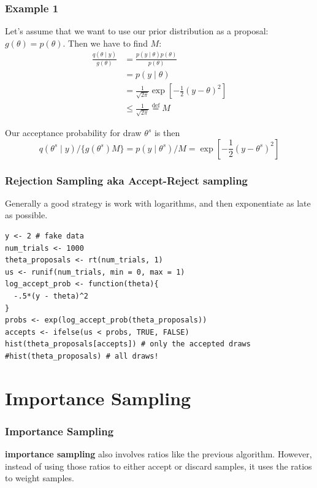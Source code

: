 \documentclass{beamer}
\begin{document}
\begin{frame}[fragile]
\frametitle{Example 1}

Let's assume that we want to use our prior distribution as a proposal: $g(\theta) = p(\theta)$. Then we have to find $M$:
\begin{align*}
\frac{q(\theta\mid y)}{g(\theta)} &= \frac{p(y \mid \theta) p(\theta)}{p(\theta)} \\
&= p(y \mid \theta) \\
&= \frac{1}{\sqrt{2\pi}} \exp\left[-\frac{1}{2} (y-\theta)^2 \right] \\
&\le \frac{1}{\sqrt{2\pi}} \overset{\text{def}}{=} M
\end{align*}

Our acceptance probability for draw $\theta^s$ is then
\[
q(\theta^s \mid y) / \{ g(\theta^s)  M\} = p(y \mid \theta^s) / M = \exp\left[-\frac{1}{2} (y-\theta^s)^2 \right]
\]


\end{frame}
\begin{frame}[fragile]
\frametitle{Rejection Sampling aka Accept-Reject sampling}

Generally a good strategy is work with logarithms, and then exponentiate as late as possible.
\begin{verbatim}
y <- 2 # fake data
num_trials <- 1000
theta_proposals <- rt(num_trials, 1)
us <- runif(num_trials, min = 0, max = 1)
log_accept_prob <- function(theta){
  -.5*(y - theta)^2
}
probs <- exp(log_accept_prob(theta_proposals))
accepts <- ifelse(us < probs, TRUE, FALSE)
hist(theta_proposals[accepts]) # only the accepted draws
#hist(theta_proposals) # all draws!
\end{verbatim}

\end{frame}

\section{Importance Sampling}
\begin{frame}[fragile]
\frametitle{Importance Sampling}

{\bf importance sampling} also involves ratios like the previous algorithm. However, instead of using those ratios to either accept or discard samples, it uses the ratios to weight samples. 
\newline


\end{frame}
\end{document}

